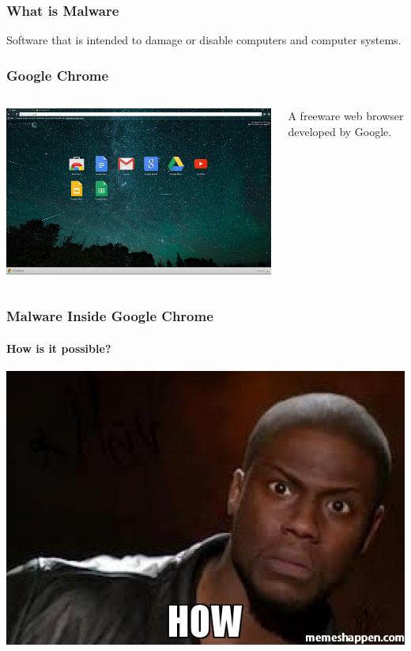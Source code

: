\documentclass[aspectratio=169]{beamer}
\begin{document}
\begin{frame}
  \frametitle{What is Malware}
  \begin{center}
    \begin{tcolorbox}[title=\href{https://en.wikipedia.org/wiki/Malware}{Definition of Malware},colback=gray]
      Software that is intended to damage or disable computers and computer systems.
    \end{tcolorbox}
  \end{center}
\end{frame}

\begin{frame}
  \frametitle{Google Chrome}
  \begin{columns}
    \begin{column}{0.5\textwidth}
      \includegraphics[scale=0.32]{google_chrome}
    \end{column}
    \begin{column}{0.5\textwidth}
      \begin{center}
        \begin{tcolorbox}[title=\href{https://en.wikipedia.org/wiki/Google_Chrome}{Google Chrome},colback=gray]
          {\small A freeware web browser developed by Google.}
        \end{tcolorbox}
      \end{center}
    \end{column}
  \end{columns}
\end{frame}

\begin{frame}
  \frametitle{Malware Inside Google Chrome}
  \framesubtitle{How is it possible?}
  \begin{center}
    \includegraphics[scale=0.2]{how}
  \end{center}
\end{frame}
\end{document}
